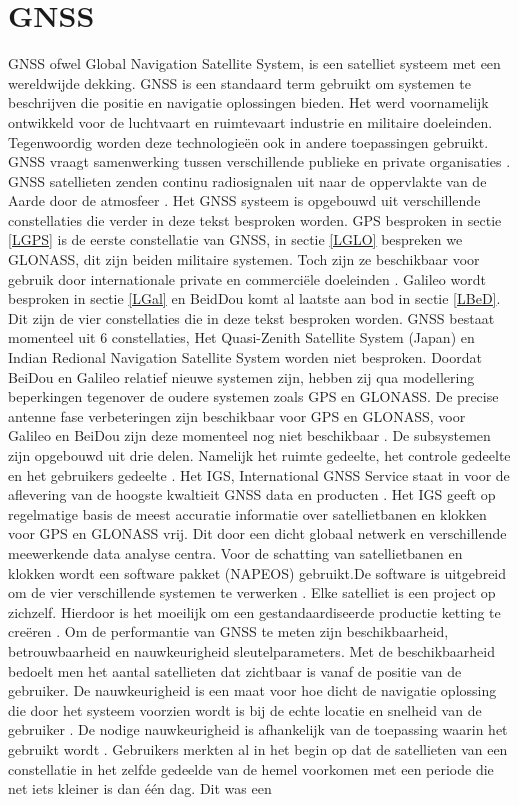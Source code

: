 \section{GNSS}
\label{LGNS}
GNSS ofwel Global Navigation Satellite System, is een satelliet systeem met een wereldwijde dekking. GNSS is een standaard term gebruikt om systemen te beschrijven die positie en navigatie oplossingen bieden. Het werd voornamelijk ontwikkeld voor de luchtvaart en ruimtevaart industrie en militaire doeleinden. Tegenwoordig worden deze technologie\"en ook in andere toepassingen gebruikt. GNSS vraagt samenwerking tussen verschillende publieke en private organisaties \cite{LBibGNSS3}. GNSS satellieten zenden continu radiosignalen uit naar de oppervlakte van de Aarde door de atmosfeer \cite{LBibGPS4}. Het GNSS systeem is opgebouwd uit verschillende constellaties die verder in deze tekst besproken worden. GPS besproken in sectie \ref{LGPS} is de eerste constellatie van GNSS, in sectie \ref{LGLO} bespreken we GLONASS, dit zijn beiden militaire systemen. Toch zijn ze beschikbaar voor gebruik door internationale private en commerci\"ele doeleinden \cite{LBibGNSS8}. Galileo wordt besproken in sectie \ref{LGal} en BeidDou komt al laatste aan bod in sectie \ref{LBeD}. Dit zijn de vier constellaties die in deze tekst besproken worden. GNSS bestaat momenteel uit 6 constellaties, Het Quasi-Zenith Satellite System (Japan) en Indian Redional Navigation Satellite System worden niet besproken. Doordat BeiDou en Galileo relatief nieuwe systemen zijn, hebben zij qua modellering beperkingen tegenover de oudere systemen zoals GPS en GLONASS. De precise antenne fase verbeteringen zijn beschikbaar voor GPS en GLONASS, voor Galileo en BeiDou zijn deze momenteel nog niet beschikbaar \cite{LBibPPP2}. De subsystemen zijn opgebouwd uit drie delen. Namelijk het ruimte gedeelte, het controle gedeelte en het gebruikers gedeelte \cite{LBibBeiDou2}.  Het IGS, International GNSS Service staat in voor de aflevering van de hoogste kwaltieit GNSS data en producten \cite{LBibGNSS}. Het IGS geeft op regelmatige basis de meest accuratie informatie over satellietbanen en klokken voor GPS en GLONASS vrij. Dit door een dicht globaal netwerk en verschillende meewerkende data analyse centra. Voor de schatting van satellietbanen en klokken wordt een software pakket (NAPEOS) gebruikt.De software is uitgebreid om de vier verschillende systemen te verwerken \cite{LBibPPP2}.  Elke satelliet is een project op zichzelf. Hierdoor is het moeilijk om een gestandaardiseerde productie ketting te cre\"eren \cite{LBibGNSS3}. Om de performantie van GNSS te meten zijn beschikbaarheid, betrouwbaarheid en nauwkeurigheid sleutelparameters. Met de beschikbaarheid bedoelt men het aantal satellieten dat zichtbaar is vanaf de positie van de gebruiker. De nauwkeurigheid is een maat voor hoe dicht de navigatie oplossing die door het systeem voorzien wordt is bij de echte locatie en snelheid van de gebruiker \cite{LBibGNSS6}. De nodige nauwkeurigheid is afhankelijk van de toepassing waarin het gebruikt wordt \cite{LBibRTK3}. Gebruikers merkten al in het begin op dat de satellieten van een constellatie in het zelfde gedeelde van de hemel voorkomen met een periode die net iets kleiner is dan \'e\'en dag. Dit was een 